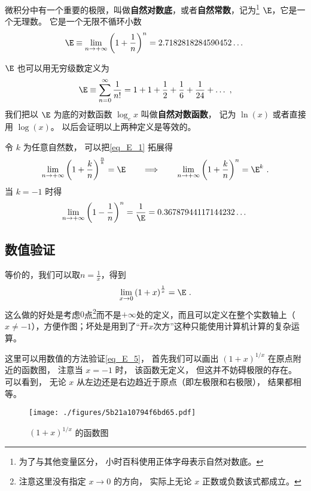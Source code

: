
微积分中有一个重要的极限，叫做\textbf{自然对数底}，或者\textbf{自然常数}，记为\footnote{为了与其他变量区分， 小时百科使用正体字母表示自然对数底。} $\E$，它是一个无理数。 它是一个无限不循环小数
\begin{equation}\label{eq_E_1}
\E \equiv \lim_{n \to +\infty} \left(1 + \frac{1}{n}\right)^n = 2.7182818284590452\dots~
\end{equation}

$\E$ 也可以用无穷级数定义为
\begin{equation}\label{eq_E_2}
\E \equiv \sum_{n=0}^\infty \frac{1}{n!} = 1 + 1 + \frac{1}{2} + \frac{1}{6} + \frac{1}{24} +\dots~,
\end{equation}
我们把以 $\E$ 为底的对数函数 $\log_e x$ 叫做\textbf{自然对数函数}， 记为 $\ln(x)$ 或者直接用 $\log(x)$。 以后会证明以上两种定义是等效的。

令 $k$ 为任意自然数， 可以把\autoref{eq_E_1} 拓展得
\begin{equation}\label{eq_E_4}
\lim_{n \to +\infty} \left(1 + \frac{k}{n}\right)^{\frac{n}{k}} = \E
\qquad \Longrightarrow\qquad
\lim_{n \to +\infty} \left(1 + \frac{k}{n}\right)^n = \E^k~.
\end{equation}
当 $k = -1$ 时得
\begin{equation}\label{eq_E_3}
\lim_{n \to +\infty} \left(1 - \frac{1}{n}\right)^n = \frac{1}{\E} = 0.36787944117144232\dots~
\end{equation}

\subsection{数值验证}
等价的，我们可以取$n = \frac{1}{x}$，得到
\begin{equation}\label{eq_E_5}
\lim_{x \to 0} \left(1 + x\right)^{\frac{1}{x}} = \E~.
\end{equation}
这么做的好处是考虑$0$点\footnote{注意这里没有指定 $x\to 0$ 的方向， 实际上无论 $x$ 正数或负数该式都成立。}而不是$+\infty$处的定义，而且可以定义在整个实数轴上（$x \neq -1$），方便作图；坏处是用到了“开$x$次方”这种只能使用计算机计算的复杂运算。

这里可以用数值的方法验证\autoref{eq_E_5}， 首先我们可以画出 $(1+x)^{1/x}$ 在原点附近的函数图， 注意当 $x = -1$ 时， 该函数无定义， 但这并不妨碍极限的存在。 可以看到， 无论 $x$ 从左边还是右边趋近于原点（即左极限和右极限）， 结果都相等。
\begin{figure}[ht]
\centering
\texttt{[image: ./figures/5b21a10794f6bd65.pdf]}
\caption{$(1+x)^{1/x}$ 的函数图} \label{fig_E_1}
\end{figure}

